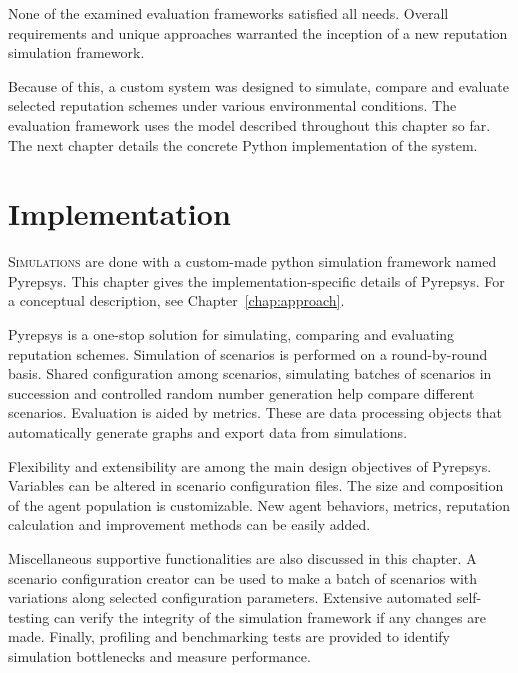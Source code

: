 \documentclass[%
    ]{\PathToTumTemplate/thesis/tum_thesis}
\begin{document}
None of the examined evaluation frameworks satisfied all needs.
Overall requirements and unique approaches warranted the inception of a new reputation simulation framework.

Because of this, a custom system was designed to simulate, compare and evaluate selected reputation schemes under various environmental conditions.
The evaluation framework uses the model described throughout this chapter so far.
The next chapter details the concrete Python implementation of the system.




\chapter{Implementation}\label{chap:implementation}

\lettrine{S}{imulations} are done with a custom-made python simulation framework named Pyrepsys.
This chapter gives the implementation-specific details of Pyrepsys. 
For a conceptual description, see Chapter~\ref{chap:approach}.

Pyrepsys is a one-stop solution for simulating, comparing and evaluating reputation schemes.
Simulation of scenarios is performed on a round-by-round basis.
Shared configuration among scenarios, simulating batches of scenarios in succession and controlled random number generation help compare different scenarios.
Evaluation is aided by metrics.
These are data processing objects that automatically generate graphs and export data from simulations.

Flexibility and extensibility are among the main design objectives of Pyrepsys.
Variables can be altered in scenario configuration files.
The size and composition of the agent population is customizable.
New agent behaviors, metrics, reputation calculation and improvement methods can be easily added.

Miscellaneous supportive functionalities are also discussed in this chapter.
A scenario configuration creator can be used to make a batch of scenarios with variations along selected configuration parameters.
Extensive automated self-testing can verify the integrity of the simulation framework if any changes are made.
Finally, profiling and benchmarking tests are provided to identify simulation bottlenecks and measure performance.
\end{document}
